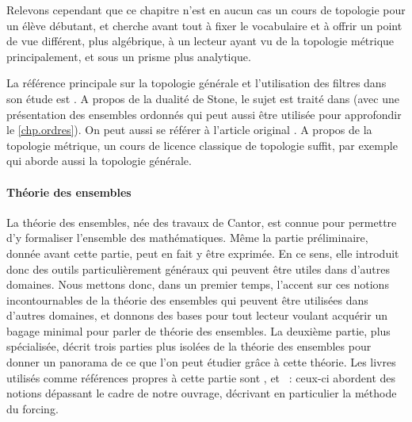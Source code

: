 \begin{itemize}
  Relevons cependant que ce chapitre n'est en aucun cas un cours de topologie
  pour un élève débutant, et cherche avant tout à fixer le vocabulaire et à
  offrir un point de vue différent, plus algébrique, à un lecteur ayant vu de la
  topologie métrique principalement, et sous un prisme plus analytique.

  La référence principale sur la topologie générale et l'utilisation des filtres
  dans son étude est \cite{bourbaki1971topologie}. A propos de la dualité de
  Stone, le sujet est traité dans \cite{DBLP:books/daglib/0093287} (avec une
  présentation des ensembles ordonnés qui peut aussi être utilisée pour
  approfondir le \cref{chp.ordres}). On peut aussi se référer à l'article
  original \cite{StoneDuality}. A propos de la topologie métrique, un cours de
  licence classique de topologie suffit, par exemple \cite{hassan2021topologie}
  qui aborde aussi la topologie générale.
\end{itemize}

\paragraph{Théorie des ensembles}
La théorie des ensembles, née des travaux de Cantor, est connue pour permettre
d'y formaliser l'ensemble des mathématiques. Même la partie préliminaire, donnée
avant cette partie, peut en fait y être exprimée. En ce sens, elle introduit
donc des outils particulièrement généraux qui peuvent être utiles dans d'autres
domaines. Nous mettons donc, dans un premier temps, l'accent sur ces notions
incontournables de la théorie des ensembles qui peuvent être utilisées dans
d'autres domaines, et donnons des bases pour tout lecteur voulant acquérir un
bagage minimal pour parler de théorie des ensembles. La deuxième partie, plus
spécialisée, décrit trois parties plus isolées de la théorie des ensembles pour
donner un panorama de ce que l'on peut étudier grâce à cette théorie. Les livres
utilisés comme références propres à cette partie sont \cite{krivine1998théorie},
et \cite{DBLP:books/daglib/0067194}~: ceux-ci abordent des notions dépassant le
cadre de notre ouvrage, décrivant en particulier la méthode du forcing.

